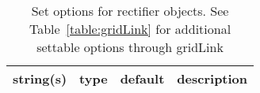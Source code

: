 \begin{table}[ht]
\centering
\begin{tabular}{p{5cm} c c p{7cm}}
\hline
string(s) & type & default & description \\
\hline
\hline
\end{tabular}
\caption{Set options for rectifier objects. See Table~\ref{table:gridLink} for additional settable options through gridLink}
\label{table:rectifier}
\end{table}
